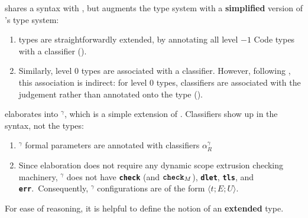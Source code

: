 \recLang{} shares a syntax with \sourceLang{}, but augments the \sourceLang{} type system with a \textbf{simplified} version of \citeauthor{isoda-24}'s type system:

\begin{enumerate} 
  \item \sourceLang{} types are straightforwardly extended, by annotating all level $-1$ \textsf{Code} types with a classifier ().
  \item Similarly, level $0$ types are associated with a classifier. However, following \citet{isoda-24}, this association is indirect: for level $0$ types, classifiers are associated with the judgement rather than annotated onto the type (). 
\end{enumerate}
\newcommand{\recCoreLang}{\coreLang{}$^\gamma$}
\recLang{} elaborates into \recCoreLang{}, which is a simple extension of \coreLang{}. Classifiers show up in the syntax, not the types:
\begin{enumerate}
  \item \recCoreLang{} formal parameters are annotated with classifiers $\alpha_R^{\gamma}$ 
  \item Since elaboration does not require any dynamic scope extrusion checking machinery, \recCoreLang{} does not have \textbf{\texttt{check}} (and $\textbf{\texttt{check}}_M$), \textbf{\texttt{dlet}}, \textbf{\texttt{tls}}, and \textbf{\texttt{err}}.\ Consequently, \recCoreLang{} configurations are of the form $\langle t;E;U\rangle$.
\end{enumerate}

For ease of reasoning, it is helpful to define the notion of an \textbf{extended} \recLang{} type.

